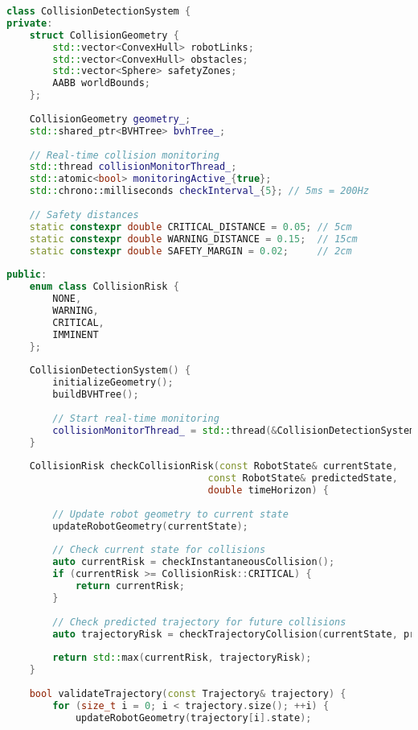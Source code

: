 \begin{lstlisting}[language=C++, caption=Advanced Collision Detection System]
class CollisionDetectionSystem {
private:
    struct CollisionGeometry {
        std::vector<ConvexHull> robotLinks;
        std::vector<ConvexHull> obstacles;
        std::vector<Sphere> safetyZones;
        AABB worldBounds;
    };
    
    CollisionGeometry geometry_;
    std::shared_ptr<BVHTree> bvhTree_;
    
    // Real-time collision monitoring
    std::thread collisionMonitorThread_;
    std::atomic<bool> monitoringActive_{true};
    std::chrono::milliseconds checkInterval_{5}; // 5ms = 200Hz
    
    // Safety distances
    static constexpr double CRITICAL_DISTANCE = 0.05; // 5cm
    static constexpr double WARNING_DISTANCE = 0.15;  // 15cm
    static constexpr double SAFETY_MARGIN = 0.02;     // 2cm
    
public:
    enum class CollisionRisk {
        NONE,
        WARNING,
        CRITICAL,
        IMMINENT
    };
    
    CollisionDetectionSystem() {
        initializeGeometry();
        buildBVHTree();
        
        // Start real-time monitoring
        collisionMonitorThread_ = std::thread(&CollisionDetectionSystem::monitorCollisions, this);
    }
    
    CollisionRisk checkCollisionRisk(const RobotState& currentState,
                                   const RobotState& predictedState,
                                   double timeHorizon) {
        
        // Update robot geometry to current state
        updateRobotGeometry(currentState);
        
        // Check current state for collisions
        auto currentRisk = checkInstantaneousCollision();
        if (currentRisk >= CollisionRisk::CRITICAL) {
            return currentRisk;
        }
        
        // Check predicted trajectory for future collisions
        auto trajectoryRisk = checkTrajectoryCollision(currentState, predictedState, timeHorizon);
        
        return std::max(currentRisk, trajectoryRisk);
    }
    
    bool validateTrajectory(const Trajectory& trajectory) {
        for (size_t i = 0; i < trajectory.size(); ++i) {
            updateRobotGeometry(trajectory[i].state);
            

\end{lstlisting}
